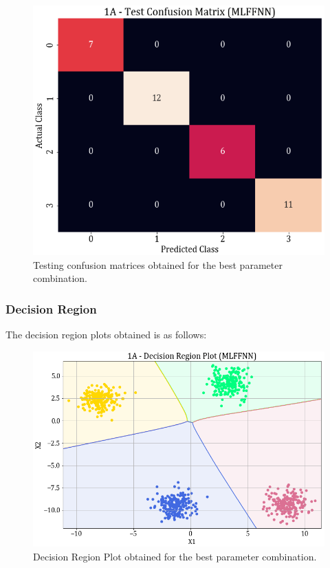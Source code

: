 \documentclass[11pt,a4paper]{article}
\begin{document}
\begin{figure}[H]
    \centering
    \includegraphics[scale=0.45]{images/1A_MLFFNN_test_confmat.png}
    \caption{Testing confusion matrices obtained for the best parameter combination.}
\end{figure}

\subsubsection{Decision Region}
The decision region plots obtained is as follows:
\begin{figure}[H]
    \centering
    \includegraphics[scale=0.6]{images/1A_MLFFNN_Decision_Plot.png}
    \caption{Decision Region Plot obtained for the best parameter combination.}
\end{figure}
\end{document}

